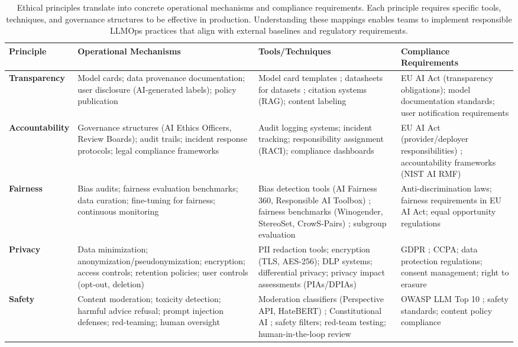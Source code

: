 \begin{table}[t]
\centering
\small
\caption{Ethical principles translate into concrete operational mechanisms and compliance requirements. Each principle requires specific tools, techniques, and governance structures to be effective in production. Understanding these mappings enables teams to implement responsible LLMOps practices that align with external baselines and regulatory requirements.}
\label{tab:ch11_ethical_principles}
\setlength{\tabcolsep}{6pt}
\renewcommand{\arraystretch}{1.3}
\begin{tabularx}{\linewidth}{@{}>{\raggedright\arraybackslash}p{2.8cm}>{\raggedright\arraybackslash}X>{\raggedright\arraybackslash}X>{\raggedright\arraybackslash}X@{}}
\toprule
\rowcolor{gray!15}
\textbf{Principle} & \textbf{Operational Mechanisms} & \textbf{Tools/Techniques} & \textbf{Compliance Requirements} \\
\midrule
\textbf{Transparency} & Model cards; data provenance documentation; user disclosure (AI-generated labels); policy publication & Model card templates \cite{mitchell_model_cards}; datasheets for datasets \cite{gebru_datasheets}; citation systems (RAG); content labeling & EU AI Act (transparency obligations); model documentation standards; user notification requirements \\
\addlinespace[2pt]
\textbf{Accountability} & Governance structures (AI Ethics Officers, Review Boards); audit trails; incident response protocols; legal compliance frameworks & Audit logging systems; incident tracking; responsibility assignment (RACI); compliance dashboards & EU AI Act (provider/deployer responsibilities) \cite{euai2025,eu_ai_act_policy_page}; accountability frameworks (NIST AI RMF) \cite{nist_ai_rmf_100_1} \\
\addlinespace[2pt]
\textbf{Fairness} & Bias audits; fairness evaluation benchmarks; data curation; fine-tuning for fairness; continuous monitoring & Bias detection tools (AI Fairness 360, Responsible AI Toolbox) \cite{holisticai2025}; fairness benchmarks (Winogender, StereoSet, CrowS-Pairs) \cite{aclanthology2023}; subgroup evaluation & Anti-discrimination laws; fairness requirements in EU AI Act; equal opportunity regulations \\
\addlinespace[2pt]
\textbf{Privacy} & Data minimization; anonymization/pseudonymization; encryption; access controls; retention policies; user controls (opt-out, deletion) & PII redaction tools; encryption (TLS, AES-256); DLP systems; differential privacy; privacy impact assessments (PIAs/DPIAs) & GDPR \cite{edpb2022}; CCPA; data protection regulations; consent management; right to erasure \\
\addlinespace[2pt]
\textbf{Safety} & Content moderation; toxicity detection; harmful advice refusal; prompt injection defenses; red-teaming; human oversight & Moderation classifiers (Perspective API, HateBERT) \cite{arxiv2023}; Constitutional AI \cite{openai2023}; safety filters; red-team testing; human-in-the-loop review & OWASP LLM Top 10 \cite{OWASP2024LLMTop10}; safety standards; content policy compliance \\
\bottomrule
\end{tabularx}
\end{table}

